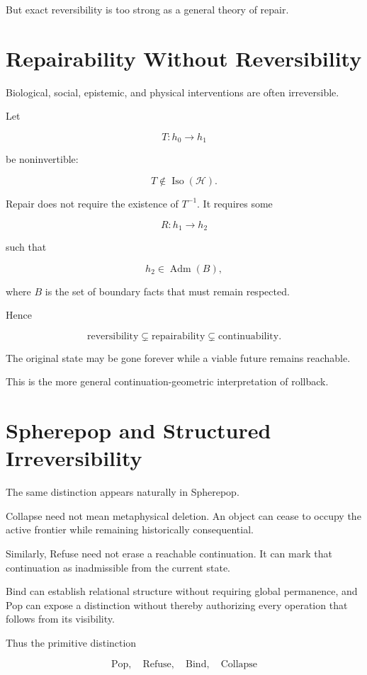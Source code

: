 \documentclass[11pt]{article}
\newcommand{\Adm}{\operatorname{Adm}}
\newcommand{\Iso}{\operatorname{Iso}}
\begin{document}
But exact reversibility is too strong as a general theory of repair.

\section{Repairability Without Reversibility}

Biological, social, epistemic, and physical interventions are often irreversible.

Let

\[ T:h_0\rightarrow h_1\]

be noninvertible:

\[ T\notin\Iso(\mathcal H).\]

Repair does not require the existence of $T^{-1}$. It requires some

\[ R:h_1\rightarrow h_2\]

such that

\[ h_2\in\Adm(B),\]

where $B$ is the set of boundary facts that must remain respected.

Hence

\[ \boxed{ \text{reversibility} \subsetneq \text{repairability} \subsetneq \text{continuability}. }\]

The original state may be gone forever while a viable future remains reachable.

This is the more general continuation-geometric interpretation of rollback.

\section{Spherepop and Structured Irreversibility}

The same distinction appears naturally in Spherepop.

Collapse need not mean metaphysical deletion. An object can cease to occupy the active frontier while remaining historically consequential.

Similarly, Refuse need not erase a reachable continuation. It can mark that continuation as inadmissible from the current state.

Bind can establish relational structure without requiring global permanence, and Pop can expose a distinction without thereby authorizing every operation that follows from its visibility.

Thus the primitive distinction

\[ \text{Pop},\quad \text{Refuse},\quad \text{Bind},\quad \text{Collapse}\]
\end{document}
